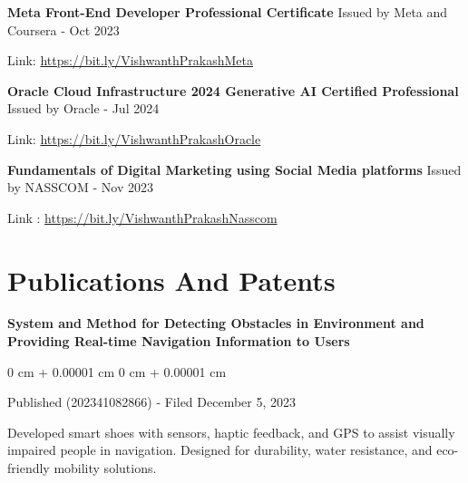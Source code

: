 \documentclass[10pt, letterpaper]{article}
\newenvironment{onecolentry}{
    \begin{adjustwidth}{
        0 cm + 0.00001 cm
    }{
        0 cm + 0.00001 cm
    }
}{
    \end{adjustwidth}
} %
\begin{document}
       \begin{samepage}
    \noindent
    \textbf{Meta Front-End Developer Professional Certificate} 
    \hfill 
    Issued by Meta and Coursera - Oct 2023
    
    \vspace{0.03 cm}
    
    \noindent
    Link: \href{https://bit.ly/VishwanthPrakashMeta}{https://bit.ly/VishwanthPrakashMeta}
\end{samepage}

\vspace{0.2 cm}

 \begin{samepage}
    \noindent
    \textbf{Oracle Cloud Infrastructure 2024 Generative AI Certified Professional  } 
    \hfill 
    Issued by Oracle - Jul 2024 
    
    \vspace{0.03 cm}
    
    \noindent
   Link: \href{https://bit.ly/VishwanthPrakashOracle }{https://bit.ly/VishwanthPrakashOracle }
\end{samepage}

\vspace{0.2 cm}

 \begin{samepage}
    \noindent
   \textbf{Fundamentals of Digital Marketing using Social Media platforms} 
    \hfill 
    Issued by NASSCOM - Nov 2023\textbf{ }
    
    \vspace{0.03 cm}
    
    \noindent
   Link : \href{https://bit.ly/VishwanthPrakashNasscom }{https://bit.ly/VishwanthPrakashNasscom }
\end{samepage}
    
    \section{Publications And Patents}
       
        \begin{samepage}
     \textbf{System and Method for Detecting Obstacles in Environment and Providing Real-time Navigation Information to Users}
      \vspace{0.05 cm}
      
      \begin{onecolentry}
               Published (202341082866) - Filed December 5, 2023 
               
               \vspace{0.05 cm}
               
               Developed smart shoes with sensors, haptic feedback, and GPS to assist visually impaired people in navigation. Designed for durability, water resistance, and eco-friendly mobility solutions.  
        \end{onecolentry}
        \end{samepage}
\end{document}
